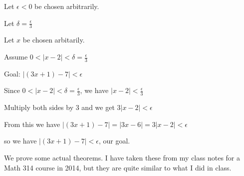 \documentclass[12pt]{article}
\begin{document}
\begin{description}
Let $\epsilon <0$ be chosen arbitrarily.

Let $\delta = \frac{\epsilon}3$

Let $x$ be chosen arbitarily.

Assume $0<|x-2|<\delta=\frac{\epsilon}3$

Goal:  $|(3x+1)-7|<\epsilon$

Since $0<|x-2|<\delta=\frac{\epsilon}3$, we have $|x-2|<\frac{\epsilon}3$

Multiply both sides by 3 and we get $3|x-2| < \epsilon$

From this we have $|(3x+1)-7| = |3x-6| = 3|x-2| < \epsilon$

so we have $|(3x+1)-7| < \epsilon$, our goal.

\end{description}

We prove some actual theorems.  I have taken these from my class notes for a Math 314 course in 2014, but they are quite similar to what I did in class.
\end{document}
